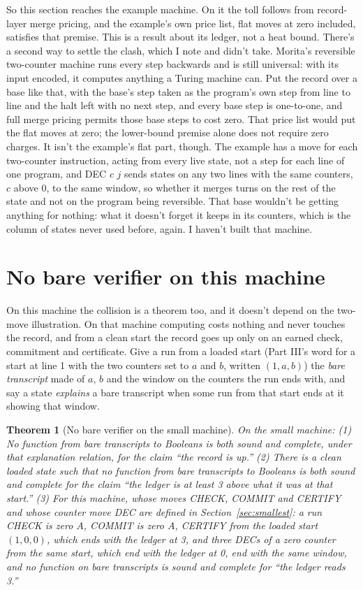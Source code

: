 \documentclass[11pt,twoside]{article}
\theoremstyle{thielethm}
\newtheorem{theorem}{Theorem}[section]
\theoremstyle{thieledef}
\theoremstyle{thieledef}
\theoremstyle{thieledef}
\theoremstyle{thielethm}
\theoremstyle{thieleobs}
\theoremstyle{thielethm}
\begin{document}
So this section reaches the example machine. On it the toll follows from record-layer merge pricing, and the example's
own price list, flat moves at zero included, satisfies that premise. This is a result about
its ledger, not a heat bound. There's a second way to settle the clash, which I note and didn't take. Morita's reversible two-counter
machine runs every step backwards and is still
universal: with its input encoded, it computes anything a Turing machine can. Put the record over a base like that, with the base's step taken as the program's own step from line to line and the halt left with no next step, and every base step is one-to-one, and full merge pricing permits those base steps to cost zero. That price list
would put the flat moves at zero; the lower-bound premise alone does not require zero charges. It isn't the example's flat part, though. The example has a move for each two-counter instruction, acting from every live state, not a step for each line of one program, and DEC $c$ $j$ sends states on any two lines with the same counters, $c$ above 0, to the same window, so whether it merges turns on the rest of the state and not on the program being reversible. That base
wouldn't be getting anything for nothing: what it doesn't forget it keeps in its counters, which
is the column of states never used before, again. I haven't built that machine.

\section{No bare verifier on this machine}

On this machine the collision is a theorem too, and it doesn't depend on the two-move illustration. On that machine computing costs nothing and never touches the record, and from a clean start the record goes up only on an earned check, commitment and certificate. Give a run from a loaded start (Part III's word for a start at line 1
with the two counters set to $a$ and $b$, written $(1, a, b)$) the \emph{bare transcript} made of $a$, $b$ and the window on the counters the run
ends with, and say a state \emph{explains} a bare transcript when some run from that start ends
at it showing that window.

\begin{theorem}[No bare verifier on the small machine]\label{thm:ver-complete}
On the small machine: (1) No function from bare transcripts to Booleans is
both sound and complete, under that explanation relation, for the claim ``the record is up.'' (2)
There is a clean loaded state such that no function from bare transcripts to Booleans is both
sound and complete for the claim ``the ledger is at least 3 above what it was at that start.''
(3) For this machine, whose moves CHECK, COMMIT and CERTIFY and whose counter move DEC are defined in Section~\ref{sec:smallest}: a run CHECK \emph{is zero} $A$, COMMIT \emph{is zero} $A$, CERTIFY from the loaded start $(1, 0, 0)$, which ends with the ledger at 3, and three DECs of a zero counter from the same start, which end with the ledger at 0, end with the
same window, and no function on bare transcripts is sound and complete for ``the ledger reads
3.''
\end{theorem}
\end{document}
